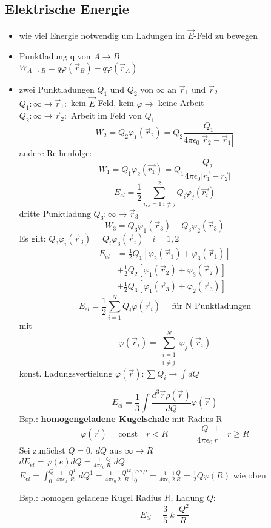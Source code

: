 \documentclass[titlepage,12pt,a4paper,ngerman]{report}
\newcommand{\tx}[1]{\textrm{#1}}
\begin{document}
\subsection{Elektrische Energie}
\begin{itemize}
\item wie viel Energie notwendig um Ladungen im $\vec{E}$-Feld zu bewegen
\item Punktladung q von $A \rightarrow B$\\
$ W_{A\rightarrow B}= q \varphi(\vec{r}_B) - q \varphi(\vec{r}_A)$
\item zwei Punktladungen $Q_1$ und $Q_2$ von $\infty$ an $\vec{r}_1$ und $\vec{r}_2$\\
$Q_1: \infty \rightarrow \vec{r}_1:$ kein $\vec{E}$-Feld, kein $\varphi \rightarrow$ keine Arbeit\\
$Q_2: \infty \rightarrow \vec{r}_2:$ Arbeit im Feld von $Q_1$\\
$$W_2 = Q_2 \varphi_1(\vec{r}_2) = Q_2 \frac{Q_1}{4\pi\epsilon_0 |\vec{r}_2 - \vec{r}_1|}$$ 
andere Reihenfolge: $$W_1 = Q_1 \varphi_2 (\vec{r_1}) = Q_1 \frac{Q_2}{4 \pi \epsilon_0  \vert \vec{r_1} - \vec{r_2}\vert }$$
$$E_{el} = \frac{1}{2} \sum_{i,j=1 \ i\neq j}^{2}Q_i \varphi_j(\vec{r_i})$$
dritte Punktladung $Q_3 : \infty \rightarrow \vec{r}_3$\\
$$W_3 = Q_3 \varphi_1(\vec{r}_3) + Q_3 \varphi_2(\vec{r}_3)$$
Es gilt: $Q_3 \varphi_i(\vec{r}_3) = Q_i \varphi_3(\vec{r}_i) \quad i = 1,2$
\begin{align*}
E_{el} &= \frac{1}{2} Q_1 [\varphi_2(\vec{r}_1) + \varphi_3(\vec{r}_1)] \\
& + \frac{1}{2} Q_2 [\varphi_1(\vec{r}_2) + \varphi_3(\vec{r}_2)] \\
& + \frac{1}{2} Q_3 [\varphi_1(\vec{r}_3) + \varphi_2(\vec{r}_3)]
\end{align*}
$$E_{el} = \frac{1}{2} \sum_{i=1}^N Q_i \varphi(\vec{r}_i) \quad \tx{ für N Punktladungen}$$
mit $$\varphi(\vec{r}_i) = \sum^N_{\substack{ i=1 \\ i \neq j }} \varphi_j(\vec{r}_i)$$
konst. Ladungsvertielung $\varphi(\vec{r}) : \sum Q_i \rightarrow \int dQ$

$$E_{el}= \frac{1}{3} \int \frac{d^3\vec{r} \rho (\vec{r})}{dQ} \varphi(\vec{r})$$
Bsp.: \textbf{homogengeladene Kugelschale} mit Radius R
$$\varphi(\vec{r}) = \tx{const} \quad  r<R \qquad = \frac{Q}{4\pi\epsilon_0} \frac{1}{r} \quad r\ge R$$
Sei zunächst $Q = 0$. $dQ$ aus $\infty \rightarrow R$\\
$dE_{el}= \varphi(e) dQ = \frac{1}{4\pi\epsilon_0} \frac{Q}{R} \; dQ$\\
$E_{el}= \int^Q_0 \frac{1}{4\pi\epsilon_0} \frac{Q^1}{R} \; dQ^1 = \frac{1}{4\pi\epsilon_0} \frac{1}{2} \frac{Q^{12}}{R} \bigg\vert_0^{???R} = \frac{1}{4\pi\epsilon_0} \frac{1}{2} \frac{Q}{R} = \frac{1}{2} Q \varphi(R)$ wie oben


Bsp.: homogen geladene Kugel Radius $R$, Ladung $Q$:
$$E_{el} = \frac{3}{5}\ k\ \frac{\ Q^2}{R}$$


\end{itemize}
\end{document}
